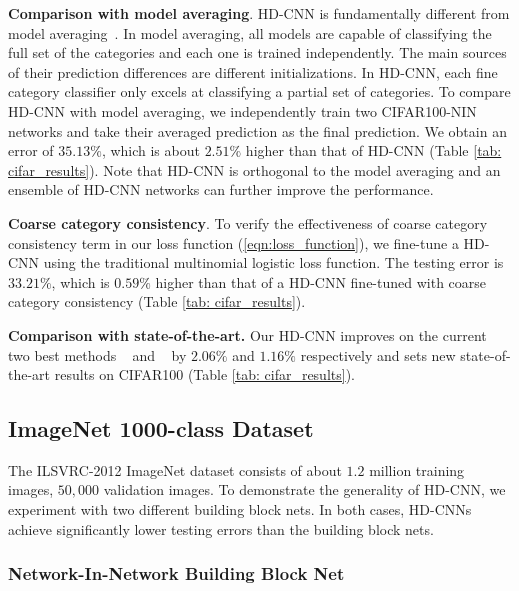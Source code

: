 \documentclass[10pt,twocolumn,letterpaper]{article}
\begin{document}
\noindent \textbf{Comparison with model averaging}. HD-CNN is fundamentally different from model averaging~\cite{krizhevsky2012imagenet}. In model averaging, all models are capable of classifying the full set of the categories and each one is trained independently. The main sources of their prediction differences are different initializations. In HD-CNN, each fine category classifier only excels at classifying a partial set of categories.
To compare HD-CNN with model averaging, we independently train two CIFAR100-NIN networks and take their averaged prediction as the final prediction. We obtain an error of $35.13\%$, which is about $2.51\%$ higher than that of HD-CNN (Table \ref{tab: cifar_results}). 
Note that HD-CNN is orthogonal to the model averaging and an ensemble of HD-CNN networks can further improve the performance.

\noindent \textbf{Coarse category consistency}. To verify the effectiveness of coarse category consistency term in our loss function (\ref{eqn:loss_function}), we fine-tune a HD-CNN using the traditional multinomial logistic loss function. The testing error is $33.21\%$, which is $0.59\%$ higher than that of a HD-CNN fine-tuned with coarse category consistency (Table \ref{tab: cifar_results}). 


\noindent \textbf{Comparison with state-of-the-art.} Our HD-CNN improves on the current two best methods ~\cite{lee2014deeply} and ~\cite{stollenga2014deep} by $2.06\%$ and $1.16\%$ respectively and sets new state-of-the-art results on CIFAR100 (Table \ref{tab: cifar_results}).

\subsection{ImageNet 1000-class Dataset}
\label{sec:imagenet_nin}

The ILSVRC-2012 ImageNet dataset consists of about $1.2$ million training images, $50,000$ validation images. To demonstrate the generality of HD-CNN, we experiment with two different building block nets. In both cases, HD-CNNs achieve significantly lower testing errors than the building block nets.

\subsubsection{Network-In-Network Building Block Net}
\end{document}
